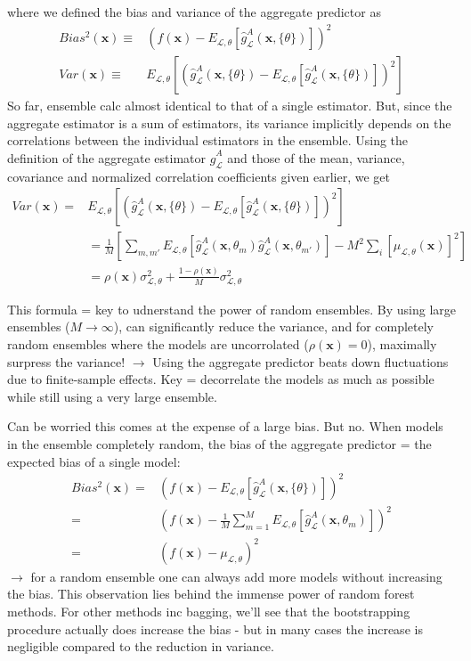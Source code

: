 \documentclass[norsk,a4paper,11pt]{article}
\begin{document}
where we defined the bias and variance of the aggregate predictor as
\begin{align}
	Bias^2 (\bm{x}) \equiv & (f(\bm{x})- E_{\mathcal{L}, \theta} [\hat{g}_\mathcal{L}^A (\bm{x}, \{ \theta\})] )^2 \\
	Var(\bm{x}) \equiv & E_{\mathcal{L}, \theta} [(\hat{g}_\mathcal{L}^A (\bm{x}, \{ \theta\}) - E_{\mathcal{L}, \theta} [\hat{g}_\mathcal{L}^A (\bm{x}, \{ \theta\})  ] )^2] 
\end{align}
So far, ensemble calc almost identical to that of a single estimator. But, since the aggregate estimator is a sum of estimators, its variance implicitly depends on the correlations between the individual estimators in the ensemble. Using the definition of the aggregate estimator $\hat{g}_\mathcal{L}^A$ and those of the mean, variance, covariance and normalized correlation coefficients given earlier, we get
\begin{align}
	Var(\bm{x}) =& E_{\mathcal{L}, \theta} [(\hat{g}_\mathcal{L}^A (\bm{x}, \{ \theta\}) - E_{\mathcal{L}, \theta} [\hat{g}_\mathcal{L}^A (\bm{x}, \{ \theta\})  ] )^2] \\
	&= \frac{1}{M}[\sum_{m, m'} E_{\mathcal{L}, \theta} [\hat{g}_\mathcal{L}^A (\bm{x}, \theta_m) \hat{g}_\mathcal{L}^A (\bm{x},\theta_{m'})] - M^2 \sum_i [\mu_{\mathcal{L}, \theta} (\bm{x})]^2  ] \\
	&= \rho(\bm{x}) \sigma_{\mathcal{L}, \theta}^2 + \frac{1- \rho(\bm{x})}{M}  \sigma_{\mathcal{L}, \theta}^2
\end{align}

This formula = key to udnerstand the power of random ensembles. By using large ensembles ($M \rightarrow \infty $), can significantly reduce the variance, and for completely random ensembles where the models are uncorrolated ($\rho(\bm{x}) = 0$), maximally surpress the variance! $\rightarrow$ Using the aggregate predictor beats down fluctuations due to finite-sample effects. Key = decorrelate the models as much as possible while still using a very large ensemble. 

Can be worried this comes at the expense of a large bias. But no. When models in the ensemble completely random, the bias of the aggregate predictor = the expected bias of a single model:
\begin{align}
	Bias^2(\bm{x}) =& (f(\bm{x}) - E_{\mathcal{L}, \theta} [\hat{g}_\mathcal{L}^A (\bm{x}, \{ \theta\})])^2 \\
	=& (f(\bm{x})- \frac{1}{M} \sum_{m=1}^M E_{\mathcal{L}, \theta} [\hat{g}_\mathcal{L}^A (\bm{x}, \theta_m)] )^2 \\
	=& (f(\bm{x}) - \mu_{\mathcal{L}, \theta} )^2
\end{align}
$\rightarrow$ for a random ensemble one can always add more models without increasing the bias. This observation lies behind the immense power of random forest methods. For other methods inc bagging, we'll see that the bootstrapping procedure actually does increase the bias - but in many cases the increase is negligible compared to the reduction in variance.
\end{document}
